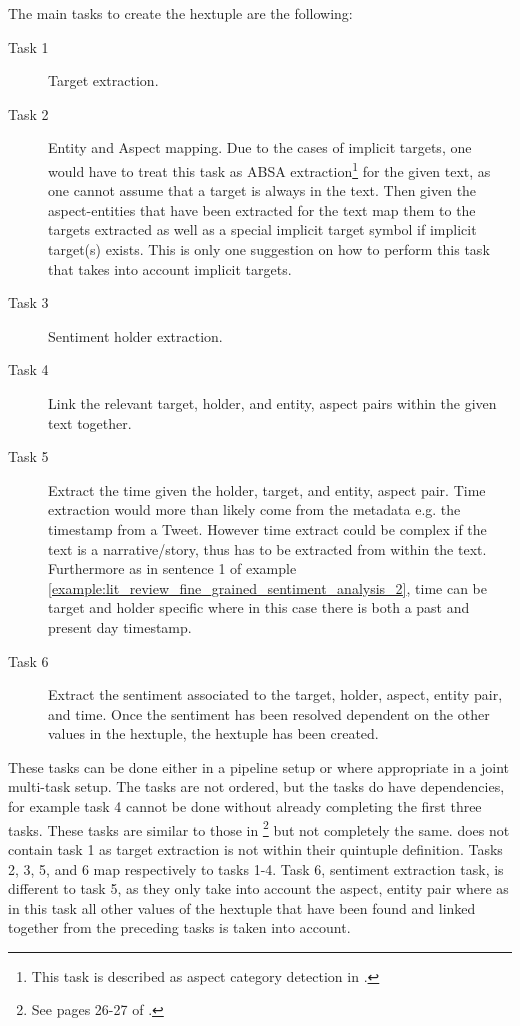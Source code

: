 The main tasks to create the hextuple are the following:
\begin{description}
    \item[Task 1] Target extraction.
    \item[Task 2] Entity and Aspect mapping. Due to the cases of implicit targets, one would have to treat this task as ABSA extraction\footnote{This task is described as aspect category detection in \citet{pontiki-etal-2016-semeval}.} for the given text, as one cannot assume that a target is always in the text. Then given the aspect-entities that have been extracted for the text map them to the targets extracted as well as a special implicit target symbol if implicit target(s) exists. This is only one suggestion on how to perform this task that takes into account implicit targets.
    \item[Task 3] Sentiment holder extraction.
    \item[Task 4] Link the relevant target, holder, and entity, aspect pairs within the given text together.
    \item[Task 5] Extract the time given the holder, target, and entity, aspect pair. Time extraction would more than likely come from the metadata e.g. the timestamp from a Tweet. However time extract could be complex if the text is a narrative/story, thus has to be extracted from within the text. Furthermore as in sentence 1 of example \ref{example:lit_review_fine_grained_sentiment_analysis_2}, time can be target and holder specific where in this case there is both a past and present day timestamp.
    \item[Task 6] Extract the sentiment associated to the target, holder, aspect, entity pair, and time. Once the sentiment has been resolved dependent on the other values in the hextuple, the hextuple has been created. 
\end{description}

These tasks can be done either in a pipeline setup or where appropriate in a joint multi-task setup. The tasks are not ordered, but the tasks do have dependencies, for example task 4 cannot be done without already completing the first three tasks. These tasks are similar to those in \citet{liu2015sentiment}\footnote{See pages 26-27 of \citet{liu2015sentiment}.} but not completely the same. \citet{liu2015sentiment} does not contain task 1 as target extraction is not within their quintuple definition. Tasks 2, 3, 5, and 6 map respectively to \citet{liu2015sentiment} tasks 1-4. Task 6, sentiment extraction task, is different to \citet{liu2015sentiment} task 5, as they only take into account the aspect, entity pair where as in this task all other values of the hextuple that have been found and linked together from the preceding tasks is taken into account.

